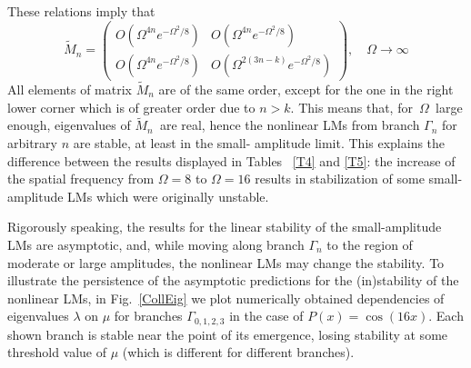 \documentclass[aps,preprint,showkeys,
]{revtex4}
\begin{document}
These relations imply that
\begin{equation}
\tilde{M}_{n}=\left(
\begin{array}{cc}
O(\Omega ^{4n}e^{-\Omega ^{2}/8}) & O(\Omega ^{4n}e^{-\Omega ^{2}/8}) \\%
[2mm]
O(\Omega ^{4n}e^{-\Omega ^{2}/8}) & O(\Omega ^{2(3n-k)}e^{-\Omega ^{2}/8})%
\end{array}%
\right) ,\quad \Omega \rightarrow \infty
\end{equation}%
All elements of matrix $\tilde{M}_{n}$ are of the same order, except for the
one in the right lower corner which is of greater order due to $n>k$. This
means that, for\textit{\ }$\Omega $\textit{\ }large enough, eigenvalues of $%
\tilde{M}_{n}$\textit{\ }are real, hence the nonlinear LMs from branch $%
\Gamma _{n}$ for arbitrary $n$ are stable, at least in the small- amplitude
limit. This explains the difference between the results displayed in Tables~%
\ref{T4} and \ref{T5}: the increase of the spatial frequency from $\Omega =8$
to $\Omega =16$ results in stabilization of some small-amplitude LMs which
were originally unstable.

Rigorously speaking, the results for the linear stability of the
small-amplitude LMs are asymptotic, and, while moving along branch $\Gamma
_{n}$ to the region of moderate or large amplitudes, the nonlinear LMs may
change the stability.
To illustrate the persistence of the asymptotic predictions for the
(in)stability of the nonlinear LMs, in Fig.~\ref{CollEig} we plot
numerically obtained dependencies of eigenvalues $\lambda $ on $\mu $ for
branches $\Gamma _{0,1,2,3}$ in the case of $P(x)=\cos \left( 16x\right) $.
Each shown branch is stable near the point of its emergence, losing
stability at some threshold value of $\mu $ (which is different for
different branches).
\end{document}
